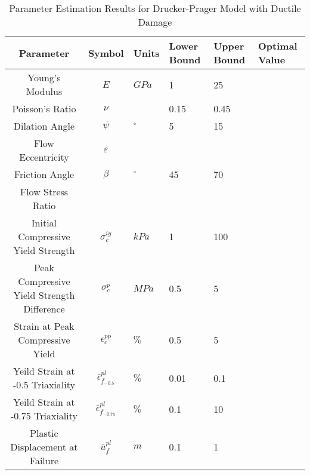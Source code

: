 \begin{table}[]
\centering
\caption{Parameter Estimation Results for Drucker-Prager Model with Ductile Damage}
\label{tab:paramDrucker}
\begin{tabular}{@{}ccllll@{}}
\toprule
Parameter                                  & Symbol                            & Units      & Lower Bound & Upper Bound & Optimal Value \\ \midrule
Young's Modulus                            & $E$                               & $GPa$      & 1           & 25          &               \\
Poisson's Ratio                            & $\nu$                             &            & 0.15        & 0.45        &               \\
Dilation Angle                             & $\psi$                            & $^{\circ}$ & 5           & 15          &               \\
Flow Eccentricity                          & $\varepsilon$                     &            &             &             &               \\
Friction Angle                             & $\beta$                           & $^{\circ}$ & 45          & 70          &               \\
Flow Stress Ratio                          &                                   &            &             &             &               \\
Initial Compressive Yield Strength         & $\sigma_c^{iy}$                   & $kPa$      & 1           & 100         &               \\
Peak Compressive Yield Strength Difference & $\sigma_c^{p}$                    & $MPa$      & 0.5         & 5           &               \\
Strain at Peak Compressive Yield           & $\epsilon_c^{pp}$                 & $\%$       & 0.5         & 5           &               \\
Yeild Strain at -0.5 Triaxiality           & $\bar{\epsilon}^{pl}_{f_{-0.5}}$  & $\%$       & 0.01        & 0.1         &               \\
Yeild Strain at -0.75 Triaxiality          & $\bar{\epsilon}^{pl}_{f_{-0.75}}$ & $\%$       & 0.1         & 10          &               \\
Plastic Displacement at Failure            & $\bar{u}^{pl}_f$                  & $m$        & 0.1         & 1           &               \\ \bottomrule
\end{tabular}
\end{table}

